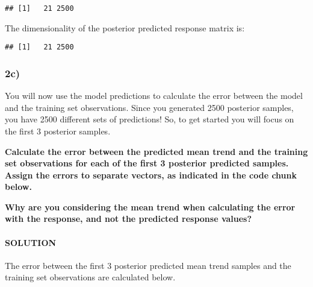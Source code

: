 \documentclass[
]{article}
\newenvironment{Shaded}{\begin{snugshade}}{\end{snugshade}}
\newcommand{\DocumentationTok}[1]{\textcolor[rgb]{0.56,0.35,0.01}{\textbf{\textit{#1}}}}
\newcommand{\FunctionTok}[1]{\textcolor[rgb]{0.00,0.00,0.00}{#1}}
\newcommand{\NormalTok}[1]{#1}
\newcommand{\SpecialCharTok}[1]{\textcolor[rgb]{0.00,0.00,0.00}{#1}}
\begin{document}
\begin{verbatim}
## [1]   21 2500
\end{verbatim}

The dimensionality of the posterior predicted response matrix is:

\begin{Shaded}
\end{Shaded}

\begin{verbatim}
## [1]   21 2500
\end{verbatim}

\hypertarget{c-1}{%
\subsubsection{2c)}\label{c-1}}

You will now use the model predictions to calculate the error between
the model and the training set observations. Since you generated 2500
posterior samples, you have 2500 different sets of predictions! So, to
get started you will focus on the first 3 posterior samples.

\textbf{Calculate the error between the predicted mean trend and the
training set observations for each of the first 3 posterior predicted
samples. Assign the errors to separate vectors, as indicated in the code
chunk below.}

\textbf{Why are you considering the mean trend when calculating the
error with the response, and not the predicted response values?}

\hypertarget{solution-7}{%
\paragraph{SOLUTION}\label{solution-7}}

The error between the first 3 posterior predicted mean trend samples and
the training set observations are calculated below.
\end{document}
